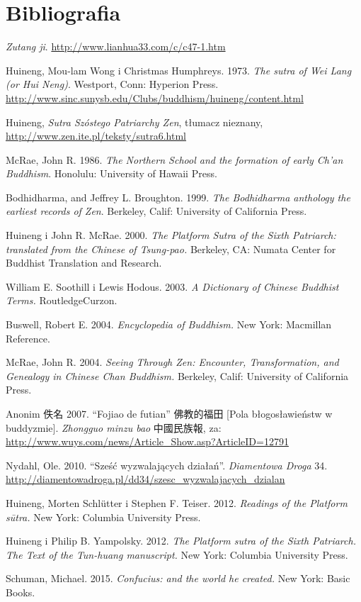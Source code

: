 \onecolumn
\section*{Bibliografia}

\textit{Zutang ji}. \url{http://www.lianhua33.com/c/c47-1.htm}


Huineng, Mou-lam Wong i Christmas Humphreys. 1973. \textit{The sutra of Wei Lang (or Hui Neng)}. Westport, Conn: Hyperion Press. \url{http://www.sinc.sunysb.edu/Clubs/buddhism/huineng/content.html}

Huineng, \textit{Sutra Szóstego Patriarchy Zen}, tłumacz nieznany, \url{http://www.zen.ite.pl/teksty/sutra6.html}

McRae, John R. 1986. \textit{The Northern School and the formation of early Ch'an Buddhism}. Honolulu: University of Hawaii Press.

Bodhidharma, and Jeffrey L. Broughton. 1999. \textit{The Bodhidharma anthology the earliest records of Zen}. Berkeley, Calif: University of California Press.

Huineng i John R. McRae. 2000. \textit{The Platform Sutra of the Sixth Patriarch: translated from the Chinese of Tsung-pao.} Berkeley, CA: Numata Center for Buddhist Translation and Research.

William E. Soothill i Lewis Hodous. 2003. \textit{A Dictionary of Chinese Buddhist Terms.} RoutledgeCurzon.%

Buswell, Robert E. 2004. \textit{Encyclopedia of Buddhism.} New York: Macmillan Reference.

McRae, John R. 2004. \textit{Seeing Through Zen: Encounter, Transformation, and Genealogy in Chinese Chan Buddhism.} Berkeley, Calif: University of California Press.

Anonim 佚名 2007. ``Fojiao de futian'' 佛教的福田 [Pola błogosławieństw w buddyzmie]. \textit{Zhongguo minzu bao} 中國民族報, za: \url{http://www.wuys.com/news/Article_Show.asp?ArticleID=12791}

Nydahl, Ole. 2010. ``Sześć wyzwalających działań''. \textit{Diamentowa Droga} 34. \url{http://diamentowadroga.pl/dd34/szesc_wyzwalajacych_dzialan}

Huineng, Morten Schlütter i Stephen F. Teiser. 2012. \textit{Readings of the Platform sūtra.} New York: Columbia University Press.%

Huineng i Philip B. Yampolsky. 2012. \textit{The Platform sutra of the Sixth Patriarch. The Text of the Tun-huang manuscript.} New York: Columbia University Press.%

Schuman, Michael. 2015. \textit{Confucius: and the world he created.} New York: Basic Books.
